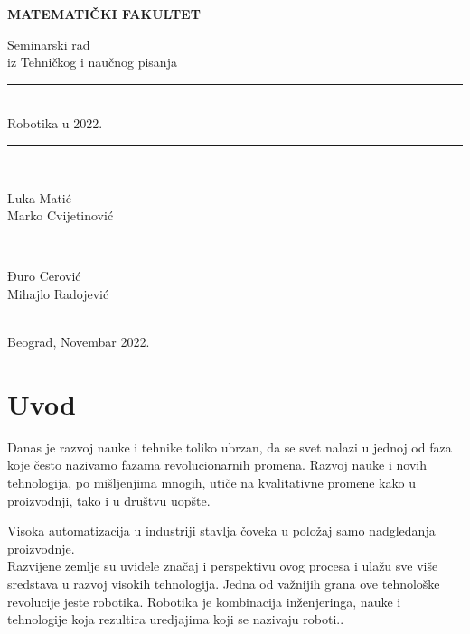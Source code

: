 \documentclass{report}
\newcommand{\HRule}{\rule{\linewidth}{0.5mm}}
\begin{document}
\vspace*{5cm}
\thispagestyle{empty}
\centerline{\huge \textbf{MATEMATIČKI FAKULTET}}
\vspace{2cm}

\begin{center}

{\Large Seminarski rad}\\
{\Large	iz Tehničkog i naučnog pisanja}\\
\Huge\HRule\\[0.4cm] %
	{Robotika u 2022.}\\
	\HRule \\[20pt] %
\begin{minipage}{0.4\textwidth}
\begin{flushleft} \large
{\Large Luka Matić}\\
{\Large Marko Cvijetinović}
\end{flushleft}
\end{minipage}
~
\begin{minipage}{0.4\textwidth}
\begin{flushright} \large
{\Large Đuro Cerović} \\
{\Large Mihajlo Radojević}\\ 
\end{flushright}
\end{minipage}\\[5cm]
\Large{Beograd, Novembar 2022.}
\end{center}

\tableofcontents
\chapter{Uvod}

Danas je razvoj nauke i tehnike toliko ubrzan, da se svet nalazi u jednoj od faza koje često nazivamo fazama revolucionarnih promena. Razvoj nauke i novih tehnologija, po mišljenjima mnogih, utiče na kvalitativne promene kako u proizvodnji, tako i u društvu uopšte.

Visoka automatizacija u industriji stavlja čoveka u položaj samo nadgledanja proizvodnje.\\
Razvijene zemlje su uvidele značaj i perspektivu ovog procesa i ulažu sve više sredstava u razvoj visokih tehnologija. Jedna od važnijih grana ove tehnološke revolucije jeste robotika. Robotika je kombinacija inženjeringa, nauke i tehnologije koja rezultira uredjajima koji se nazivaju roboti..\cite{robotics2022,robots2022}
\end{document}
